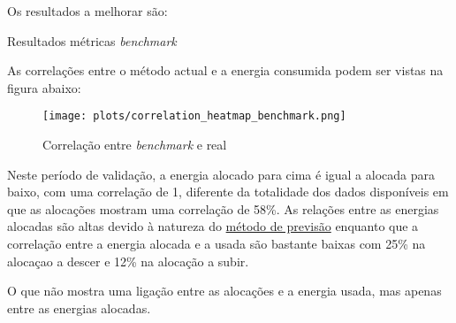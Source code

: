 Os resultados a melhorar são:\\
\begin{table}[H]
    \centering
    \caption{Resultados métricas \textit{benchmark}}    
    \resizebox{0.8\linewidth}{!}{}
    \label{tab:benchmarkmetrics}
    \end{table}

As correlações entre o método actual e a energia consumida podem ser vistas na figura abaixo:\\


\begin{figure}[H]
    \centering
    \texttt{[image: plots/correlation\_heatmap\_benchmark.png]}
    \caption{Correlação entre \textit{benchmark} e real}
    \label{fig:benchmarkcorr}
\end{figure}

Neste período de validação, a energia alocado para cima é igual a alocada para baixo, com uma correlação de 1, diferente da totalidade dos dados disponíveis em que as alocações mostram uma correlação de 58\%.
As relações entre as energias alocadas são altas devido à natureza do \hyperref[]{método de previsão} enquanto que a correlação entre a energia alocada e a usada são bastante baixas com 25\% na alocaçao a descer e 12\% na alocação a subir.\par
O que não mostra uma ligação entre as alocações e a energia usada, mas apenas entre as energias alocadas.\par

